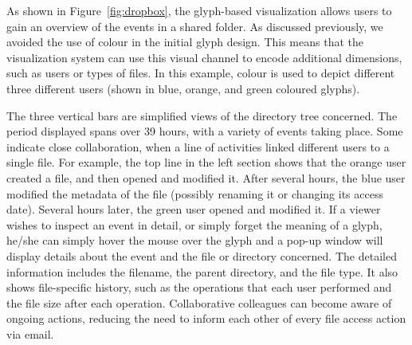As shown in Figure~\ref{fig:dropbox}, the glyph-based visualization allows users to gain an overview of the events in a shared folder.
As discussed previously, we avoided the use of colour in the initial glyph design.
This means that the visualization system can use this visual channel to encode additional dimensions, such as users or types of files.
In this example, colour is used to depict different three different users (shown in blue, orange, and green coloured glyphs).

The three vertical bars are simplified views of the directory tree concerned.
The period displayed spans over 39 hours, with a variety of events taking place.
Some indicate close collaboration, when a line of activities linked different users to a single file.
For example, the top line in the left section shows that the orange user created a file, and then opened and modified it.
After several hours, the blue user modified the metadata of the file (possibly renaming it or changing its access date).
Several hours later, the green user opened and modified it.
If a viewer wishes to inspect an event in detail, or simply forget the meaning of a glyph, he/she can simply hover the mouse over the glyph and a pop-up window will display details about the event and the file or directory concerned.
The detailed information includes the filename, the parent directory, and the file type.
It also shows file-specific history, such as the operations that each user performed and the file size after each operation.
Collaborative colleagues can become aware of ongoing actions, reducing the need to inform each other of every file access action via email.

